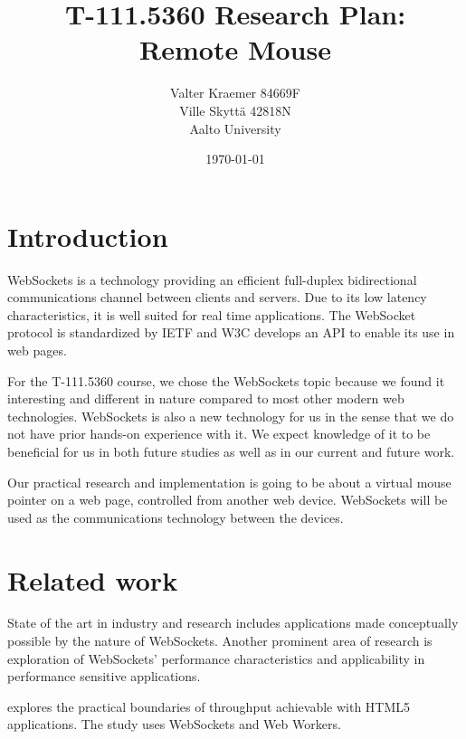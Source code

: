 \documentclass[12pt,a4paper,english,oneside]{article}
\begin{document}
\title{T-111.5360 Research Plan:\\[5mm]
Remote Mouse}

\author{Valter Kraemer 84669F \\
  Ville Skyttä 42818N \\
Aalto University}

\date{\today}

\maketitle


\section{Introduction}

WebSockets is a technology providing an efficient full-duplex
bidirectional communications channel between clients and servers. Due
to its low latency characteristics, it is well suited for real time
applications. The WebSocket protocol is standardized by IETF
\citep{rfc} and W3C \citep{w3c} develops an API to enable its use in
web pages.

For the T-111.5360 course, we chose the WebSockets topic because we
found it interesting and different in nature compared to most other
modern web technologies. WebSockets is also a new technology for us in
the sense that we do not have prior hands-on experience with it. We
expect knowledge of it to be beneficial for us in both future studies
as well as in our current and future work.

Our practical research and implementation is going to be about a
virtual mouse pointer on a web page, controlled from another web
device. WebSockets will be used as the communications technology
between the devices.

\section{Related work}

State of the art in industry and research includes applications made
conceptually possible by the nature of WebSockets. Another prominent
area of research is exploration of WebSockets' performance
characteristics and applicability in performance sensitive
applications.

\citet{throughput} explores the practical boundaries of throughput
achievable with HTML5 applications. The study uses WebSockets and Web
Workers.
\end{document}
